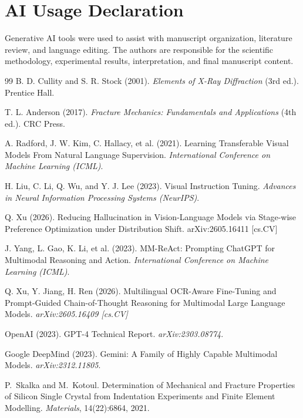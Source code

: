 \documentclass[11pt]{article}
\begin{document}
\section*{AI Usage Declaration}
Generative AI tools were used to assist with manuscript
organization, literature review, and language editing. The authors are responsible for the scientific methodology, experimental results, interpretation, and final manuscript content.

\begin{thebibliography}{99}
B. D. Cullity and S. R. Stock (2001).
\textit{Elements of X-Ray Diffraction} (3rd ed.). Prentice Hall.

T. L. Anderson (2017).
\textit{Fracture Mechanics: Fundamentals and Applications} (4th ed.). CRC Press.

A. Radford, J. W. Kim, C. Hallacy, et al. (2021).
Learning Transferable Visual Models From Natural Language Supervision.
\textit{International Conference on Machine Learning (ICML)}.

H. Liu, C. Li, Q. Wu, and Y. J. Lee (2023).
Visual Instruction Tuning.
\textit{Advances in Neural Information Processing Systems (NeurIPS)}.

 Q. Xu (2026).
Reducing Hallucination in Vision-Language Models via Stage-wise Preference Optimization under Distribution Shift. arXiv:2605.16411 [cs.CV]

J. Yang, L. Gao, K. Li, et al. (2023).
MM-ReAct: Prompting ChatGPT for Multimodal Reasoning and Action.
\textit{International Conference on Machine Learning (ICML)}.

 Q. Xu, Y. Jiang, H. Ren (2026).
Multilingual OCR-Aware Fine-Tuning and Prompt-Guided Chain-of-Thought Reasoning for Multimodal Large Language Models.
\textit{arXiv:2605.16409 [cs.CV]}

OpenAI (2023).
GPT-4 Technical Report.
\textit{arXiv:2303.08774}.

Google DeepMind (2023).
Gemini: A Family of Highly Capable Multimodal Models.
\textit{arXiv:2312.11805}.

P.~Skalka and M.~Kotoul.
\newblock Determination of Mechanical and Fracture Properties of Silicon Single Crystal from Indentation Experiments and Finite Element Modelling.
\newblock \emph{Materials}, 14(22):6864, 2021.


\end{thebibliography}
\end{document}
